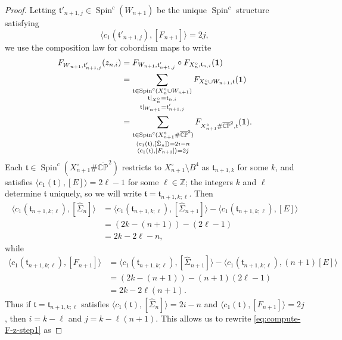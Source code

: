 \documentclass[11pt]{amsart}
\numberwithin{equation}{section}
\numberwithin{theorem}{section}
\theoremstyle{definition}
\newcommand{\Z}{\mathbb{Z}}
\newcommand{\CP}{\mathbb{CP}}
\newcommand{\spc}{\operatorname{Spin}^c}
\newcommand{\spint}{\mathfrak{t}}
\newcommand{\cptwo}{\overline{\CP}^2}
\begin{document}
\begin{proof}
Letting $\spint'_{n+1,j} \in \spc(W_{n+1})$ be the unique $\spc$ structure satisfying
\[ \langle c_1(\spint'_{n+1,j}), [F_{n+1}] \rangle = 2j, \]
we use the composition law for cobordism maps to write
\begin{gather} \label{eq:compute-F-z-step1}
\begin{aligned}
F_{W\vphantom{'}_{n+1\vphantom{,j}},\spint'_{n+1,j}}(z_{n,i}) &= F_{W_{n+1},\spint'_{n+1,j}} \circ F_{X^\circ_n,\spint_{n,i}}({\bf 1}) \\
&= \sum_{\substack{\spint \in \spc(X^\circ_n \cup W_{n+1}) \\ \spint|_{X^\circ_n} = \spint_{n,i} \\ \spint|_{W_{n+1}} = \spint'_{n+1,j}}} F_{X^\circ_n \cup W_{n+1}, \spint}( {\bf 1} ) \\
&= \sum_{\substack{\spint \in \spc(X^\circ_{n+1} \# \cptwo) \\ \langle c_1(\spint), [\hat\Sigma_n] \rangle = 2i-n \\ \langle c_1(\spint), [F_{n+1}] \rangle = 2j }} F_{X^\circ_{n+1} \# \cptwo, \spint}( {\bf 1} ).
\end{aligned}
\end{gather}
Each $\spint \in \spc(X^\circ_{n+1} \# \cptwo)$ restricts to $X^\circ_{n+1} \setminus B^4$ as $\spint_{n+1,k}$ for some $k$, and satisfies $\langle c_1(\spint), [E]\rangle = 2\ell - 1$ for some $\ell \in \Z$; the integers $k$ and $\ell$ determine $\spint$ uniquely, so we will write $\spint = \spint_{n+1,k;\ell}$.  Then
\begin{align*}
\langle c_1(\spint_{n+1,k;\ell}), [\hat\Sigma_n] \rangle &= \langle c_1(\spint_{n+1,k;\ell}), [\hat\Sigma_{n+1}] \rangle - \langle c_1(\spint_{n+1,k;\ell}), [E] \rangle  \\
&= (2k - (n+1)) - (2\ell - 1) \\
&= 2k - 2\ell - n,
\end{align*}
while
\begin{align*}
\langle c_1(\spint_{n+1,k;\ell}), [F_{n+1}] \rangle &= \langle c_1(\spint_{n+1,k;\ell}), [\hat\Sigma_{n+1}] \rangle - \langle c_1(\spint_{n+1,k;\ell}), (n+1)[E] \rangle \\
&= (2k - (n+1)) - (n+1)(2\ell-1) \\
&= 2k - 2\ell(n+1).
\end{align*}
Thus if $\spint = \spint_{n+1,k;\ell}$ satisfies $\langle c_1(\spint), [\hat\Sigma_n] \rangle = 2i-n$ and $\langle c_1(\spint), [F_{n+1}] \rangle = 2j$, then $i=k-\ell$ and $j = k-\ell(n+1)$.  This allows us to rewrite \eqref{eq:compute-F-z-step1} as

\end{proof}
\end{document}
